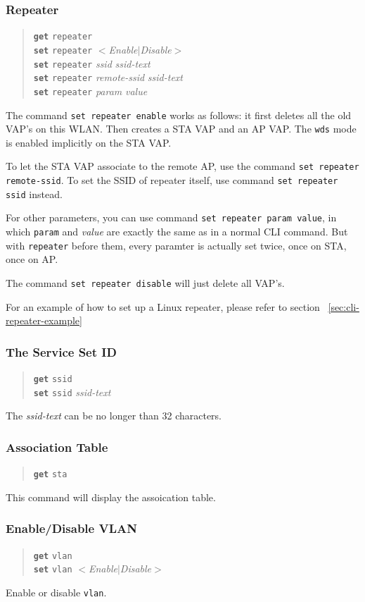 \documentclass[10pt,fullpage]{article}
\newcommand{\mytt}[1]{{\texttt{#1}}}
\newcommand{\bv}{\begin{verse}}
\newcommand{\ev}{\end{verse}}
\newcommand{\clicmd}[1]{{\textbf{\texttt{#1}}}}
\newcommand{\cliparam}[1]{{\texttt{#1}}}
\newcommand{\clival}[1]{{\emph{#1}}}
\begin{document}
\subsubsection{Repeater}
\label{sec:cli-repeater}
\bv
\clicmd{get} \cliparam{repeater}\\
\clicmd{set} \cliparam{repeater} $<$\clival{Enable}$|$\clival{Disable}$>$\\
\clicmd{set} \cliparam{repeater} \clival{ssid} \clival{ssid-text}\\
\clicmd{set} \cliparam{repeater} \clival{remote-ssid} \clival{ssid-text}\\
\clicmd{set} \cliparam{repeater} \clival{param} \clival{value}\\
\ev
The command \mytt{set repeater enable} works as follows: it first deletes
all the old VAP's on this WLAN. Then creates a STA VAP and an AP VAP.
The \cliparam{wds} mode is enabled implicitly on the STA VAP.

To let the STA VAP associate to the remote AP, use the command
\mytt{set repeater remote-ssid}. To set the SSID of repeater itself,
use command \mytt{set repeater ssid} instead.

For other parameters, you can use command \mytt{set repeater param value},
in which \cliparam{param} and \clival{value} are exactly the same as in
a normal CLI command. But with \cliparam{repeater} before them, every paramter
is actually set twice, once on STA, once on AP.

The command \mytt{set repeater disable} will just delete all VAP's.

For an example of how to set up a Linux repeater, 
please refer to section ~\ref{sec:cli-repeater-example}

\subsubsection{The Service Set ID}
\bv
\clicmd{get} \cliparam{ssid}\\
\clicmd{set} \cliparam{ssid} \clival{ssid-text}
\ev
The \clival{ssid-text} can be no longer than 32 characters.

\subsubsection{Association Table}
\bv
\clicmd{get} \cliparam{sta}
\ev
This command will display the assoication table.

\subsubsection{Enable/Disable VLAN}
\bv
\clicmd{get} \cliparam{vlan}\\
\clicmd{set} \cliparam{vlan} $<$\clival{Enable}$|$\clival{Disable}$>$
\ev
Enable or disable \cliparam{vlan}.
\end{document}
